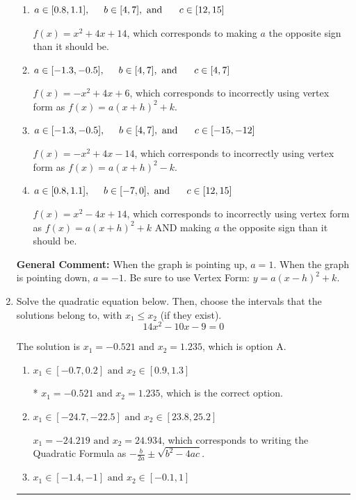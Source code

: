 \documentclass{extbook}[14pt]
\newcommand{\litem}[1]{\item #1

\rule{\textwidth}{0.4pt}}
\begin{document}
\begin{enumerate}
{\begin{enumerate}[label=\Alph*.]
* $f(x)=-x^{2} -4 x + 6$, which is the correct option.
\item \( a \in [0.8, 1.1], \hspace*{5mm} b \in [4, 7], \text{ and } \hspace*{5mm} c \in [12, 15] \)

$f(x)=x^{2} +4 x + 14$, which corresponds to making $a$ the opposite sign than it should be.
\item \( a \in [-1.3, -0.5], \hspace*{5mm} b \in [4, 7], \text{ and } \hspace*{5mm} c \in [4, 7] \)

$f(x)=-x^{2} +4 x + 6$, which corresponds to incorrectly using vertex form as $f(x) = a(x+h)^2+k$.
\item \( a \in [-1.3, -0.5], \hspace*{5mm} b \in [4, 7], \text{ and } \hspace*{5mm} c \in [-15, -12] \)

$f(x)=-x^{2} +4 x -14$, which corresponds to incorrectly using vertex form as $f(x) = a(x+h)^2 - k$.
\item \( a \in [0.8, 1.1], \hspace*{5mm} b \in [-7, 0], \text{ and } \hspace*{5mm} c \in [12, 15] \)

$f(x)=x^{2} -4 x + 14$, which corresponds to incorrectly using vertex form as $f(x) = a(x+h)^2+k$ AND making $a$ the opposite sign than it should be.
\end{enumerate}

\textbf{General Comment:} When the graph is pointing up, $a=1$. When the graph is pointing down, $a=-1$. Be sure to use Vertex Form: $y = a(x-h)^2+k$.
}
\litem{
Solve the quadratic equation below. Then, choose the intervals that the solutions belong to, with $x_1 \leq x_2$ (if they exist).
\[ 14x^{2} -10 x -9 = 0 \]

The solution is \( x_1 = -0.521 \text{ and } x_2 = 1.235 \), which is option A.\begin{enumerate}[label=\Alph*.]
\item \( x_1 \in [-0.7, 0.2] \text{ and } x_2 \in [0.9, 1.3] \)

* $x_1 = -0.521 \text{ and } x_2 = 1.235$, which is the correct option.
\item \( x_1 \in [-24.7, -22.5] \text{ and } x_2 \in [23.8, 25.2] \)

 $x_1 = -24.219 \text{ and } x_2 = 24.934$, which corresponds to writing the Quadratic Formula as $-\frac{b}{2a} \pm \sqrt{b^2 - 4ac}$.
\item \( x_1 \in [-1.4, -1] \text{ and } x_2 \in [-0.1, 1] \)


\end{enumerate}}
\end{enumerate}
\end{document}
